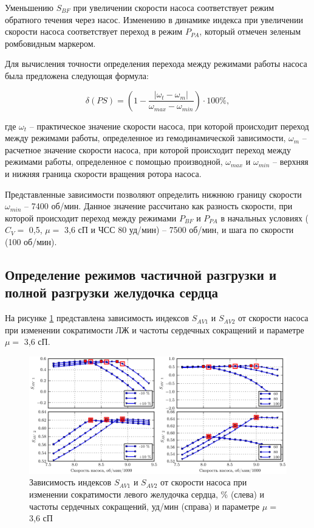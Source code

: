 Уменьшению $S_{BF}$ при увеличении скорости насоса соответствует режим обратного течения через насос. Изменению в динамике индекса при увеличении скорости насоса соответствует переход в режим $P_{PA}$, который отмечен зеленым ромбовидным маркером. 

Для вычисления точности определения перехода между режимами работы насоса была предложена следующая формула:

\begin{equation}
	\label{eq:ps_identification_accuracy}
	\delta(PS) = \left(1 - \frac{\lvert \omega_t - \omega_m \rvert}{\omega_{max} - \omega_{min}} \right) \cdot 100\%,
\end{equation}

\noindent где $\omega_t$ -- практическое значение скорости насоса, при которой происходит переход между режимами работы, определенное из гемодинамической зависимости, $\omega_m$ -- расчетное значение скорости насоса, при которой происходит переход между режимами работы, определенное с помощью производной, $\omega_{max}$ и $\omega_{min}$ -- верхняя и нижняя граница скорости вращения ротора насоса. 

Представленные зависимости позволяют определить нижнюю границу скорости $\omega_{min}$ -- 7400 об/мин. Данное значение рассчитано как разность скорости, при которой происходит переход между режимами $P_{BF}$ и $P_{PA}$ в начальных условиях ($C_V =$ 0,5, $\mu =$ 3,6 сП и ЧСС 80 уд/мин) -- 7500 об/мин, и шага по скорости (100 об/мин).

\subsection*{Определение режимов частичной разгрузки и полной разгрузки желудочка сердца}

На рисунке \ref{img:pumping_states_pa_fa_36} представлена зависимость индексов $S_{AV1}$ и $S_{AV2}$ от скорости насоса при изменении сократимости ЛЖ и частоты сердечных сокращений и параметре $\mu =$ 3,6 сП. 

\begin{figure}[!ht] 
  \center
  \includegraphics [scale=1.0] {../images/c3_pa_fa_36}
  \caption{Зависимость индексов $S_{AV1}$ и $S_{AV2}$ от скорости насоса при изменении сократимости левого желудочка сердца, \% (слева) и частоты сердечных сокращений, уд/мин (справа) и параметре $\mu =$ 3,6 сП} 
  \label{img:pumping_states_pa_fa_36}  
\end{figure}

